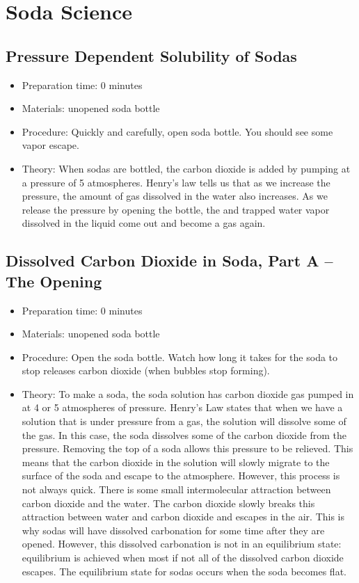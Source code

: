 \section{Soda Science}

\subsection{Pressure Dependent Solubility of Sodas}
\begin{itemize}
\item{Preparation time: 0 minutes}
\item{Materials: unopened soda bottle}
\item{Procedure: Quickly and carefully, open soda bottle. You should see some vapor escape.}
\item{Theory: When sodas are bottled, the carbon dioxide is added by pumping  at a pressure of 5 atmospheres. Henry’s law tells us that as we increase the pressure, the amount of gas dissolved in the water also increases. As we release the pressure by opening the bottle, the  and trapped water vapor dissolved in the liquid come out and become a gas again.}
\end{itemize}

\subsection{Dissolved Carbon Dioxide in Soda, Part A -- The Opening}
\begin{itemize}
\item{Preparation time: 0 minutes}
\item{Materials: unopened soda bottle}
\item{Procedure: Open the soda bottle. Watch how long it takes for the soda to stop releases carbon dioxide (when bubbles stop forming).}
\item{Theory: To make a soda, the soda solution has carbon dioxide gas pumped in at 4 or 5 atmospheres of pressure. Henry’s Law states that when we have a solution that is under pressure from a gas, the solution will dissolve some of the gas. In this case, the soda dissolves some of the carbon dioxide from the pressure. Removing the top of a soda allows this pressure to be relieved. This means that the carbon dioxide in the solution will slowly migrate to the surface of the soda and escape to the atmosphere. However, this process is not always quick. There is some small intermolecular attraction between carbon dioxide and the water. The carbon dioxide slowly breaks this attraction between water and carbon dioxide and escapes in the air. This is why sodas will have dissolved carbonation for some time after they are opened. However, this dissolved carbonation is not in an equilibrium state: equilibrium is achieved when most if not all of the dissolved carbon dioxide escapes. The equilibrium state for sodas occurs when the soda becomes flat.}
\end{itemize}

